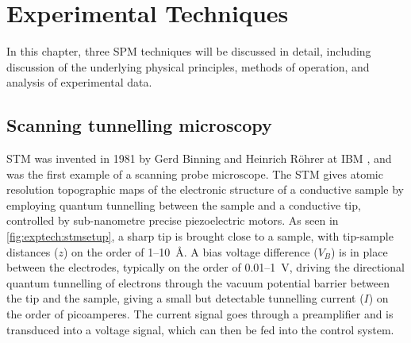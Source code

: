 
\chapter{Experimental Techniques}
\label{ch:exptech}

In this chapter, three \acf{SPM} techniques will be discussed in detail, including discussion of the underlying physical principles, methods of operation, and analysis of experimental data.



\section{Scanning tunnelling microscopy}

\Acf{STM} was invented in 1981 by Gerd Binning and Heinrich R\"ohrer at IBM \citep{binnig1982surface}, and was the first example of a scanning probe microscope. The \ac{STM} gives atomic resolution topographic maps of the electronic structure of a conductive sample by employing quantum tunnelling between the sample and a conductive tip, controlled by sub-nanometre precise piezoelectric motors. As seen in \autoref{fig:exptech:stmsetup}, a sharp tip is brought close to a sample, with tip-sample distances ($z$) on the order of 1--\SI{10}{\angstrom}. A bias voltage difference ($V_B$) is in place between the electrodes, typically on the order of 0.01--\SI{1}{\volt}, driving the directional quantum tunnelling of electrons through the vacuum potential barrier between the tip and the sample, giving a small but detectable tunnelling current ($I$) on the order of picoamperes. The current signal goes through a preamplifier and is transduced into a voltage signal, which can then be fed into the control system.

\begin{figure} [h]
    \centering
    \caption{}
    \label{fig:exptech:stmsetup}
\end{figure}

